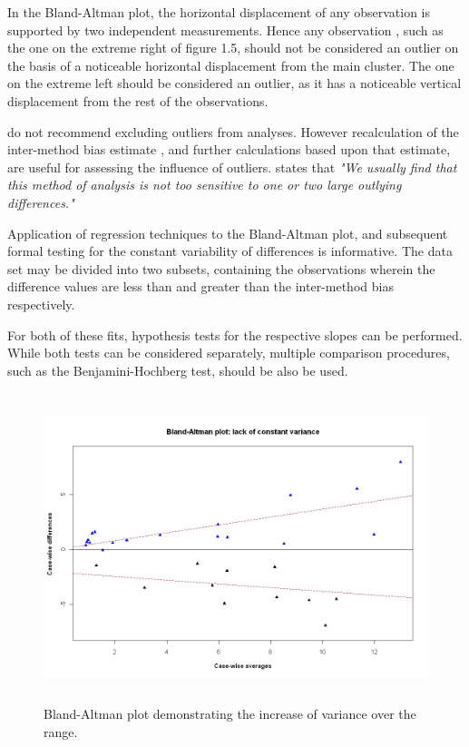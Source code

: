 \documentclass[Main.tex]{subfiles}
\begin{document}
	In the Bland-Altman plot, the horizontal displacement of any
	observation is supported by two independent measurements. Hence
	any observation , such as the one on the extreme right of figure
	1.5, should not be considered an outlier on the basis of a
	noticeable horizontal displacement from the main cluster. The one
	on the extreme left should be considered an outlier, as it has a
	noticeable vertical displacement from the rest of the
	observations.
	
	\citet*{BA99} do not recommend excluding outliers from analyses.
	However recalculation of the inter-method bias estimate , and
	further calculations based upon that estimate, are useful for
	assessing the influence of outliers.\citep{BA99} states that
	\emph{"We usually find that this method of analysis is not too
		sensitive to one or two large outlying differences."}

	Application of regression techniques to the Bland-Altman 
	plot, and subsequent formal testing for the constant variability of differences is informative. The data set may be divided into two subsets, containing the observations wherein the difference values are less than and greater than the inter-method bias respectively.
	

	For both of these fits, hypothesis tests for the respective slopes
	can be performed. While both tests can be considered separately,
	multiple comparison procedures, such as the Benjamini-Hochberg
	\citep{BH} test, should be also be used.
	
	\begin{figure}[h!]
		\begin{center}
			\includegraphics[height=90mm]{images/BAFanEffect.jpeg}
			\caption{Bland-Altman plot demonstrating the increase of variance over the range.}\label{BAFanEffect}
		\end{center}
	\end{figure}
	
\end{document}
